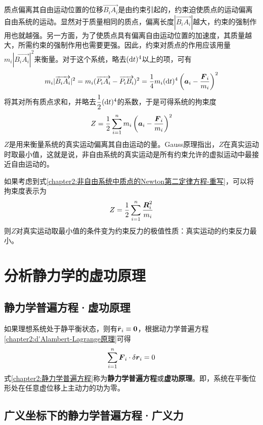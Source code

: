 质点偏离其自由运动位置的位移$\vec{B_iA_i}$是由约束引起的，约束迫使质点的运动偏离自由系统的运动。显然对于质量相同的质点，偏离长度$|\vec{B_iA_i}|$越大，约束的强制作用也就越强。另一方面，为了使质点具有偏离自由运动位置的加速度，其质量越大，所需约束的强制作用也需要更强。因此，约束对质点的作用应该用量$m_i|\vec{B_iA_i}|^2$来衡量。对于这个系统，略去$(\mathrm{d} t)^4$以上的项，可有
\begin{equation*}
	m_i|\overrightarrow{B_iA_i}|^2 = m_i(\overrightarrow{P_iA_i}-\overrightarrow{P_iB_i})^2 = \frac14 m_i(\mathrm{d} t)^4\left(\boldsymbol{a}_i-\frac{\boldsymbol{F}_i}{m_i}\right)^2
\end{equation*}
将其对所有质点求和，并略去$\dfrac12(\mathrm{d} t)^4$的系数，于是可得系统的拘束度
\begin{equation*}
	Z = \frac12 \sum_{i=1}^nm_i\left(\boldsymbol{a}_i-\frac{\boldsymbol{F}_i}{m_i}\right)^2
\end{equation*}
$Z$是用来衡量系统的真实运动偏离其自由运动的量。Gauss原理指出，$Z$在真实运动时取最小值，这就是说，非自由系统的真实运动是所有约束允许的虚拟运动中最接近自由运动的。

如果考虑到式\eqref{chapter2:非自由系统中质点的Newton第二定律方程-重写}，可以将拘束度表示为
\begin{equation}
	Z = \frac12 \sum_{i=1}^n \frac{\boldsymbol{R}_i^2}{m_i}
\end{equation}
则$Z$对真实运动取最小值的条件变为约束反力的极值性质：真实运动的约束反力最小。

\section{分析静力学的虚功原理}

\subsection{静力学普遍方程·虚功原理}

如果理想系统处于静平衡状态，则有$\ddot{\boldsymbol{r}}_i\equiv\boldsymbol{0}$，根据动力学普遍方程\eqref{chapter2:d'Alambert-Lagrange原理}可得
\begin{equation}
	\sum_{i=1}^n \boldsymbol{F}_i\cdot \delta \boldsymbol{r}_i = 0
	\label{chapter2:静力学普遍方程}
\end{equation}
式\eqref{chapter2:静力学普遍方程}称为{\bf 静力学普遍方程}或{\bf 虚功原理}。即，系统在平衡位形处在任意虚位移上主动力的功为零。

\subsection{广义坐标下的静力学普遍方程·广义力}\label{chapter2:subsection-广义坐标下的静力学普遍方程·广义力}

